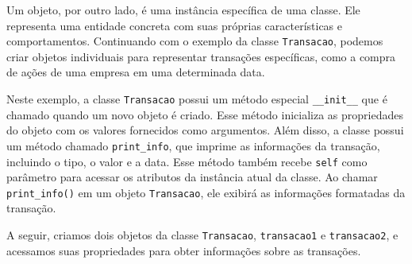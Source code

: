 \documentclass[
  portuguese,
  letterpaper,
  DIV=11,
  numbers=noendperiod]{scrreprt}
\newenvironment{Shaded}{\begin{snugshade}}{\end{snugshade}}
\newcommand{\BuiltInTok}[1]{\textcolor[rgb]{0.00,0.23,0.31}{#1}}
\newcommand{\FunctionTok}[1]{\textcolor[rgb]{0.28,0.35,0.67}{#1}}
\newcommand{\KeywordTok}[1]{\textcolor[rgb]{0.00,0.23,0.31}{\textbf{#1}}}
\newcommand{\NormalTok}[1]{\textcolor[rgb]{0.00,0.23,0.31}{#1}}
\newcommand{\OperatorTok}[1]{\textcolor[rgb]{0.37,0.37,0.37}{#1}}
\newcommand{\SpecialCharTok}[1]{\textcolor[rgb]{0.37,0.37,0.37}{#1}}
\newcommand{\SpecialStringTok}[1]{\textcolor[rgb]{0.13,0.47,0.30}{#1}}
\newcommand{\VariableTok}[1]{\textcolor[rgb]{0.07,0.07,0.07}{#1}}
\theoremstyle{definition}
\theoremstyle{remark}
\begin{document}
Um objeto, por outro lado, é uma instância específica de uma classe. Ele
representa uma entidade concreta com suas próprias características e
comportamentos. Continuando com o exemplo da classe \texttt{Transacao},
podemos criar objetos individuais para representar transações
específicas, como a compra de ações de uma empresa em uma determinada
data.

\begin{Shaded}
\end{Shaded}

Neste exemplo, a classe \texttt{Transacao} possui um método especial
\texttt{\_\_init\_\_} que é chamado quando um novo objeto é criado. Esse
método inicializa as propriedades do objeto com os valores fornecidos
como argumentos. Além disso, a classe possui um método chamado
\texttt{print\_info}, que imprime as informações da transação, incluindo
o tipo, o valor e a data. Esse método também recebe \texttt{self} como
parâmetro para acessar os atributos da instância atual da classe. Ao
chamar \texttt{print\_info()} em um objeto \texttt{Transacao}, ele
exibirá as informações formatadas da transação.

A seguir, criamos dois objetos da classe \texttt{Transacao},
\texttt{transacao1} e \texttt{transacao2}, e acessamos suas propriedades
para obter informações sobre as transações.
\end{document}

